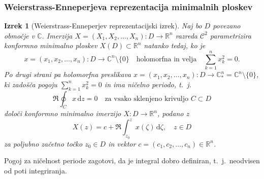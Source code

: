 \documentclass[8pt]{beamer}
\theoremstyle{definition}
\theoremstyle{remark}
\theoremstyle{plain}
\newtheorem{izrek}[definicija]{Izrek}
\numberwithin{equation}{section}  %
\begin{document}
\begin{frame}
    \frametitle{Weierstrass-Enneperjeva reprezentacija minimalnih ploskev}

    \begin{izrek}[Weierstrass-Enneperjev reprezentacijski izrek]
        Naj bo $D$ povezano območje v $\mathbb{C}$. Imerzija $X=\left(X_1, X_2, \ldots, X_n\right): D \rightarrow \mathbb{R}^n$ razreda $\mathscr{C}^2$ parametrizira konformno minimalno ploskev $X(D) \subset \mathbb{R}^n$ natanko tedaj, ko je
        \begin{equation*}
            x=\left(x_1, x_2, \ldots, x_n\right): D \rightarrow \mathbb{C}^n \setminus \{0\} \quad \text{holomorfna in velja} \quad  \sum_{k=1}^n x_k^2=0.
        \end{equation*}
        \pause 
        Po drugi strani pa holomorfna preslikava $x=\left(x_1, x_2, \ldots, x_n\right): D \rightarrow \mathbb{C}_*^n=\mathbb{C}^n \setminus\{0\}$, ki zadošča pogoju $\sum_{k=1}^nx_k^2=0$ in ima ničelno periodo, t.~j.~
        \begin{equation*}
            \Re \oint_C x \, \mathrm{d} z=0 \quad \text{za vsako sklenjeno krivuljo } C \subset D
        \end{equation*}
        določi konformno minimalno imerzijo $X: D \rightarrow \mathbb{R}^n$, podano z 
        \begin{equation*}
            X(z)=c+\Re \int_{z_0}^z x(\zeta) \, \mathrm{d} \zeta, \quad z \in D
        \end{equation*}
        za poljubno začetno točko $z_0 \in D$ in vektor $c=\left(c_1, c_2, \ldots, c_n\right) \in \mathbb{R}^n$.
    \end{izrek}
    Pogoj za ničelnost periode zagotovi, da je integral dobro definiran, t.~j.~neodvisen od poti integriranja.
    
\end{frame}
\end{document}
